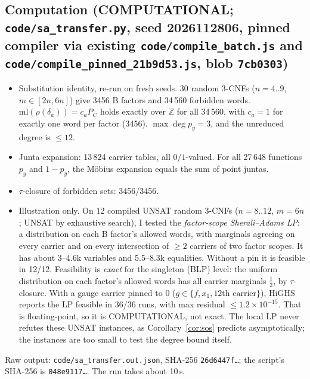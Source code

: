 \documentclass[11pt]{article}
\theoremstyle{definition}
\newcommand{\ml}{\mathrm{ml}}
\begin{document}
\subsection*{Computation (COMPUTATIONAL; \texttt{code/sa\_transfer.py}, seed 2026112806, pinned compiler via existing \texttt{code/compile\_batch.js} and \texttt{code/compile\_pinned\_21b9d53.js}, blob \texttt{7cb0303})}
\begin{itemize}
\item[(A)] Substitution identity, re-run on fresh seeds. 30 random 3-CNFs ($n=4..9$, $m\in[2n,6n]$) give 3456 B factors and 34\,560 forbidden words. $\ml(\rho(\delta_a))=c_aP_C$ holds exactly over $\mathbb Z$ for all 34\,560, with $c_a=1$ for exactly one word per factor (3456). $\max\deg p_y=3$, and the unreduced degree is $\le12$.
\item[(J)] Junta expansion: 13\,824 carrier tables, all $0/1$-valued. For all 27\,648 functions $p_y$ and $1-p_y$, the M\"obius expansion equals the sum of point juntas.
\item[(T)] $\tau$-closure of forbidden sets: 3456/3456.
\item[(L)] Illustration only. On 12 compiled UNSAT random 3-CNFs ($n=8..12$, $m=6n$; UNSAT by exhaustive search), I tested the \emph{factor-scope Sherali--Adams LP}: a distribution on each B factor's allowed words, with marginals agreeing on every carrier and on every intersection of $\ge2$ carriers of two factor scopes. It has about 3--4.6k variables and 5.5--8.3k equalities. Without a pin it is feasible in 12/12. Feasibility is \emph{exact} for the singleton (BLP) level: the uniform distribution on each factor's allowed words has all carrier marginals $\tfrac12$, by $\tau$-closure. With a gauge carrier pinned to $0$ ($g\in\{f,x_1,\text{12th carrier}\}$), HiGHS reports the LP feasible in 36/36 runs, with max residual $\le1.2\times10^{-15}$. That is floating-point, so it is COMPUTATIONAL, not exact. The local LP never refutes these UNSAT instances, as Corollary~\ref{cor:sos} predicts asymptotically; the instances are too small to test the degree bound itself.
\end{itemize}
Raw output: \texttt{code/sa\_transfer.out.json}, SHA-256 \texttt{26d6447f\ldots}; the script's SHA-256 is \texttt{048e9117\ldots}. The run takes about 10\,s.
\end{document}

